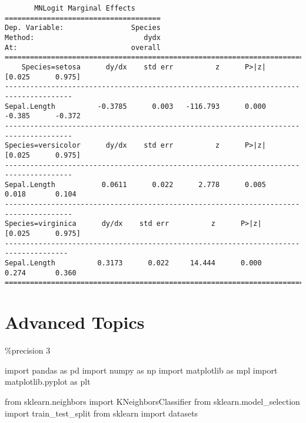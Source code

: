 \documentclass[
  letterpaper,
  DIV=11,
  numbers=noendperiod]{scrreprt}
\newenvironment{Shaded}{\begin{snugshade}}{\end{snugshade}}
\newcommand{\DecValTok}[1]{\textcolor[rgb]{0.68,0.00,0.00}{#1}}
\newcommand{\ImportTok}[1]{\textcolor[rgb]{0.00,0.46,0.62}{#1}}
\newcommand{\NormalTok}[1]{\textcolor[rgb]{0.00,0.23,0.31}{#1}}
\newcommand{\OperatorTok}[1]{\textcolor[rgb]{0.37,0.37,0.37}{#1}}
\begin{document}
\begin{verbatim}
       MNLogit Marginal Effects      
=====================================
Dep. Variable:                Species
Method:                          dydx
At:                           overall
=====================================================================================
    Species=setosa      dy/dx    std err          z      P>|z|      [0.025      0.975]
--------------------------------------------------------------------------------------
Sepal.Length          -0.3785      0.003   -116.793      0.000      -0.385      -0.372
--------------------------------------------------------------------------------------
Species=versicolor      dy/dx    std err          z      P>|z|      [0.025      0.975]
--------------------------------------------------------------------------------------
Sepal.Length           0.0611      0.022      2.778      0.005       0.018       0.104
--------------------------------------------------------------------------------------
Species=virginica      dy/dx    std err          z      P>|z|      [0.025      0.975]
-------------------------------------------------------------------------------------
Sepal.Length          0.3173      0.022     14.444      0.000       0.274       0.360
=====================================================================================
\end{verbatim}


\hypertarget{advanced-topics-1}{%
\chapter{Advanced Topics}\label{advanced-topics-1}}

\begin{Shaded}
\begin{Highlighting}[]
\OperatorTok{\%}\NormalTok{precision }\DecValTok{3}

\ImportTok{import}\NormalTok{ pandas }\ImportTok{as}\NormalTok{ pd}
\ImportTok{import}\NormalTok{ numpy }\ImportTok{as}\NormalTok{ np}
\ImportTok{import}\NormalTok{ matplotlib }\ImportTok{as}\NormalTok{ mpl}
\ImportTok{import}\NormalTok{ matplotlib.pyplot }\ImportTok{as}\NormalTok{ plt}

\ImportTok{from}\NormalTok{ sklearn.neighbors }\ImportTok{import}\NormalTok{ KNeighborsClassifier}
\ImportTok{from}\NormalTok{ sklearn.model\_selection }\ImportTok{import}\NormalTok{ train\_test\_split}
\ImportTok{from}\NormalTok{ sklearn }\ImportTok{import}\NormalTok{ datasets}

\end{Highlighting}
\end{Shaded}
\end{document}
